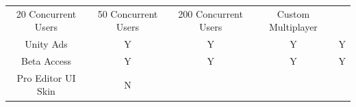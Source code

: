 \documentclass[12pt]{article}
\begin{document}
\begin{longtable}[]{@{}ccccc@{}}
\begin{minipage}[t]{0.18\columnwidth}
20 Concurrent Users\strut
\end{minipage} & \begin{minipage}[t]{0.14\columnwidth}\centering\strut
50 Concurrent Users\strut
\end{minipage} & \begin{minipage}[t]{0.14\columnwidth}\centering\strut
200 Concurrent Users\strut
\end{minipage} & \begin{minipage}[t]{0.23\columnwidth}\centering\strut
Custom Multiplayer\strut
\end{minipage}\tabularnewline
\begin{minipage}[t]{0.18\columnwidth}\centering\strut
Unity Ads\strut
\end{minipage} & \begin{minipage}[t]{0.18\columnwidth}\centering\strut
Y\strut
\end{minipage} & \begin{minipage}[t]{0.14\columnwidth}\centering\strut
Y\strut
\end{minipage} & \begin{minipage}[t]{0.14\columnwidth}\centering\strut
Y\strut
\end{minipage} & \begin{minipage}[t]{0.23\columnwidth}\centering\strut
Y\strut
\end{minipage}\tabularnewline
\begin{minipage}[t]{0.18\columnwidth}\centering\strut
Beta Access\strut
\end{minipage} & \begin{minipage}[t]{0.18\columnwidth}\centering\strut
Y\strut
\end{minipage} & \begin{minipage}[t]{0.14\columnwidth}\centering\strut
Y\strut
\end{minipage} & \begin{minipage}[t]{0.14\columnwidth}\centering\strut
Y\strut
\end{minipage} & \begin{minipage}[t]{0.23\columnwidth}\centering\strut
Y\strut
\end{minipage}\tabularnewline
\begin{minipage}[t]{0.18\columnwidth}\centering\strut
Pro Editor UI Skin\strut
\end{minipage} & \begin{minipage}[t]{0.18\columnwidth}\centering\strut
N\strut
\end{minipage} & \begin{minipage}[t]{0.14\columnwidth}\centering\strut

\end{minipage}
\end{longtable}
\end{document}
